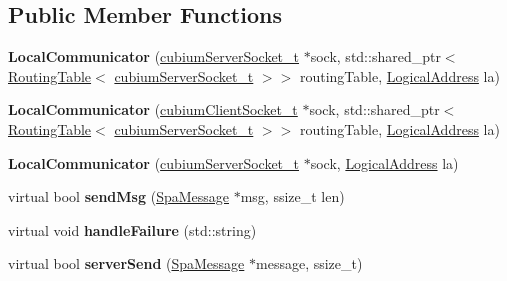 \subsection*{Public Member Functions}
\begin{DoxyCompactItemize}
\item 
\mbox{\label{classLocalCommunicator_a477260797392154cc43815852ced969c}} 
{\bfseries Local\+Communicator} (\hyperlink{structcubiumServerSocket__t}{cubium\+Server\+Socket\+\_\+t} $\ast$sock, std\+::shared\+\_\+ptr$<$ \hyperlink{classRoutingTable}{Routing\+Table}$<$ \hyperlink{structcubiumServerSocket__t}{cubium\+Server\+Socket\+\_\+t} $>$$>$ routing\+Table, \hyperlink{structLogicalAddress}{Logical\+Address} la)
\item 
\mbox{\label{classLocalCommunicator_ac5845882ec445ca5f3bedbaf666073c0}} 
{\bfseries Local\+Communicator} (\hyperlink{structcubiumClientSocket__t}{cubium\+Client\+Socket\+\_\+t} $\ast$sock, std\+::shared\+\_\+ptr$<$ \hyperlink{classRoutingTable}{Routing\+Table}$<$ \hyperlink{structcubiumServerSocket__t}{cubium\+Server\+Socket\+\_\+t} $>$$>$ routing\+Table, \hyperlink{structLogicalAddress}{Logical\+Address} la)
\item 
\mbox{\label{classLocalCommunicator_a22dbee26502e3ac2bdf46b9f094d881d}} 
{\bfseries Local\+Communicator} (\hyperlink{structcubiumServerSocket__t}{cubium\+Server\+Socket\+\_\+t} $\ast$sock, \hyperlink{structLogicalAddress}{Logical\+Address} la)
\item 
\mbox{\label{classLocalCommunicator_afb8fc8a82069dac7bf08f736fa76c4c8}} 
virtual bool {\bfseries send\+Msg} (\hyperlink{structSpaMessage}{Spa\+Message} $\ast$msg, ssize\+\_\+t len)
\item 
\mbox{\label{classLocalCommunicator_a0d6816af83fd55a79990f0b8caa4e164}} 
virtual void {\bfseries handle\+Failure} (std\+::string)
\item 
\mbox{\label{classLocalCommunicator_a6175c2c35727bb081c5f518e1750dd86}} 
virtual bool {\bfseries server\+Send} (\hyperlink{structSpaMessage}{Spa\+Message} $\ast$message, ssize\+\_\+t)
\item 
\mbox{\label{classLocalCommunicator_afca7f865eda5dca2fc4c3bf5ca697ab8}} 

\end{DoxyCompactItemize}
